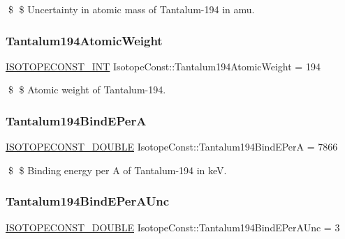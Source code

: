 \$ \$ Uncertainty in atomic mass of Tantalum-\/194 in amu. \mbox{\label{group___isotope_const-_tantalum-_ta194_gafcb87f06984c4edbca018040857af9f0}} 
\subsubsection{\texorpdfstring{Tantalum194\+Atomic\+Weight}{Tantalum194AtomicWeight}}
{\footnotesize\ttfamily \mbox{\hyperlink{group___isotope_const-_macros_ga5f18360b3e99483a35c32d789e62621c}{I\+S\+O\+T\+O\+P\+E\+C\+O\+N\+S\+T\+\_\+\+I\+NT}} Isotope\+Const\+::\+Tantalum194\+Atomic\+Weight = 194}

\$ \$ Atomic weight of Tantalum-\/194. \mbox{\label{group___isotope_const-_tantalum-_ta194_ga7f59beae33dc511e3208155c4327b9fc}} 
\subsubsection{\texorpdfstring{Tantalum194\+Bind\+E\+PerA}{Tantalum194BindEPerA}}
{\footnotesize\ttfamily \mbox{\hyperlink{group___isotope_const-_macros_ga8f45a7272ce02c0b4c65c44636ed719a}{I\+S\+O\+T\+O\+P\+E\+C\+O\+N\+S\+T\+\_\+\+D\+O\+U\+B\+LE}} Isotope\+Const\+::\+Tantalum194\+Bind\+E\+PerA = 7866}

\$ \$ Binding energy per A of Tantalum-\/194 in keV. \mbox{\label{group___isotope_const-_tantalum-_ta194_gad6e359a1dbddd715dc9214fb419f9d85}} 
\subsubsection{\texorpdfstring{Tantalum194\+Bind\+E\+Per\+A\+Unc}{Tantalum194BindEPerAUnc}}
{\footnotesize\ttfamily \mbox{\hyperlink{group___isotope_const-_macros_ga8f45a7272ce02c0b4c65c44636ed719a}{I\+S\+O\+T\+O\+P\+E\+C\+O\+N\+S\+T\+\_\+\+D\+O\+U\+B\+LE}} Isotope\+Const\+::\+Tantalum194\+Bind\+E\+Per\+A\+Unc = 3}

